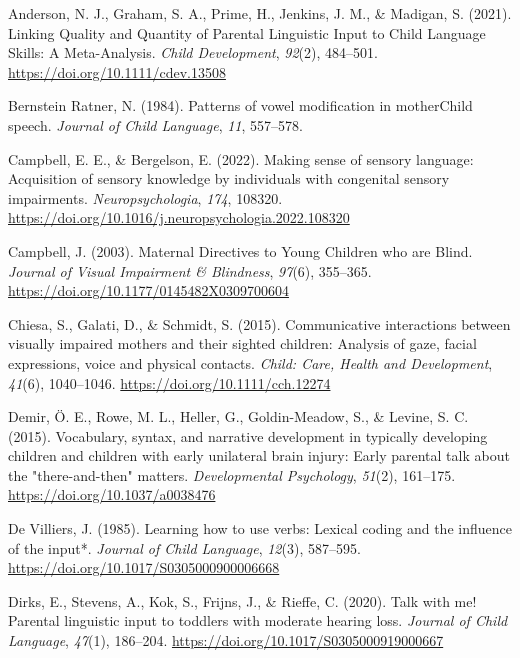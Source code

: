 \documentclass[english,man]{apa6}
\begin{document}
\leavevmode\hypertarget{ref-anderson2021}{}%
Anderson, N. J., Graham, S. A., Prime, H., Jenkins, J. M., \& Madigan, S. (2021). Linking Quality and Quantity of Parental Linguistic Input to Child Language Skills: A Meta-Analysis. \emph{Child Development}, \emph{92}(2), 484--501. \url{https://doi.org/10.1111/cdev.13508}

\leavevmode\hypertarget{ref-bernsteinratner1984}{}%
Bernstein Ratner, N. (1984). Patterns of vowel modification in motherChild speech. \emph{Journal of Child Language}, \emph{11}, 557--578.

\leavevmode\hypertarget{ref-campbell2022}{}%
Campbell, E. E., \& Bergelson, E. (2022). Making sense of sensory language: Acquisition of sensory knowledge by individuals with congenital sensory impairments. \emph{Neuropsychologia}, \emph{174}, 108320. \url{https://doi.org/10.1016/j.neuropsychologia.2022.108320}

\leavevmode\hypertarget{ref-campbell2003}{}%
Campbell, J. (2003). Maternal Directives to Young Children who are Blind. \emph{Journal of Visual Impairment \& Blindness}, \emph{97}(6), 355--365. \url{https://doi.org/10.1177/0145482X0309700604}

\leavevmode\hypertarget{ref-chiesa2015}{}%
Chiesa, S., Galati, D., \& Schmidt, S. (2015). Communicative interactions between visually impaired mothers and their sighted children: Analysis of gaze, facial expressions, voice and physical contacts. \emph{Child: Care, Health and Development}, \emph{41}(6), 1040--1046. \url{https://doi.org/10.1111/cch.12274}

\leavevmode\hypertarget{ref-demir2015}{}%
Demir, Ö. E., Rowe, M. L., Heller, G., Goldin-Meadow, S., \& Levine, S. C. (2015). Vocabulary, syntax, and narrative development in typically developing children and children with early unilateral brain injury: Early parental talk about the "there-and-then" matters. \emph{Developmental Psychology}, \emph{51}(2), 161--175. \url{https://doi.org/10.1037/a0038476}

\leavevmode\hypertarget{ref-devilliers1985}{}%
De Villiers, J. (1985). Learning how to use verbs: Lexical coding and the influence of the input*. \emph{Journal of Child Language}, \emph{12}(3), 587--595. \url{https://doi.org/10.1017/S0305000900006668}

\leavevmode\hypertarget{ref-dirks2020}{}%
Dirks, E., Stevens, A., Kok, S., Frijns, J., \& Rieffe, C. (2020). Talk with me! Parental linguistic input to toddlers with moderate hearing loss. \emph{Journal of Child Language}, \emph{47}(1), 186--204. \url{https://doi.org/10.1017/S0305000919000667}
\end{document}
